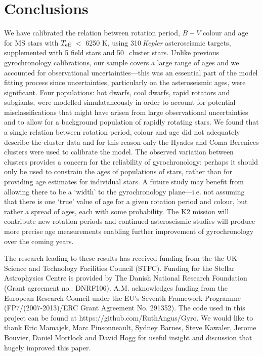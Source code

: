 \documentclass[10pt,preprint]{aastex}
\newcommand{\teff}{$T_{\rm{eff}}$}
\newcommand{\nastero}{310}
\newcommand{\nHC}{50~}
\begin{document}
\section{Conclusions}
\label{sec:conclusions}

We have calibrated the relation between rotation period, $B-V$ colour and age for MS stars with \teff$~<$ 6250 K, using \nastero$~${\it Kepler} asteroseismic targets, supplemented with 5 field stars and \nHC$~$cluster stars.
Unlike previous gyrochronology calibrations, our sample covers a large range of ages and we accounted for observational uncertainties---this was an essential part of the model fitting process since uncertainties, particularly on the asteroseismic ages, were significant.
Four populations: hot dwarfs, cool dwarfs, rapid rotators and subgiants, were modelled simulataneously in order to account for potential misclassifications that might have arisen from large observational uncertainties and to allow for a background population of rapidly rotating stars.
We found that a single relation between rotation period, colour and age did not adequately describe the cluster data and for this reason only the Hyades and Coma Berenices clusters were used to calibrate the model.
The observed variation between clusters provides a concern for the reliability of gyrochronology: perhaps it should only be used to constrain the ages of populations of stars, rather than for providing age estimates for individual stars.
A future study may benefit from allowing there to be a `width' to the gyrochronology plane---i.e. not assuming that there is one `true' value of age for a given rotation period and colour, but rather a spread of ages, each with some probability.
The K2 mission will contribute new rotation periods and continued asteroseismic studies will produce more precise age measurements enabling further improvement of gyrochronology over the coming years.

The research leading to these results has received funding from the the UK Science and Technology Facilities Council (STFC).
Funding for the Stellar Astrophysics Centre is provided by The Danish National Research Foundation (Grant agreement no.: DNRF106).
A.M. acknowledges funding from the European Research Council under the EU’s Seventh Framework Programme (FP7/(2007-2013)/ERC Grant Agreement No. 291352).
The code used in this project can be found at https://github.com/RuthAngus/Gyro.
We would like to thank Eric Mamajek, Marc Pinsonneault, Sydney Barnes, Steve Kawaler, Jerome Bouvier, Daniel Mortlock and David Hogg for useful insight and discussion that hugely improved this paper.
\end{document}

